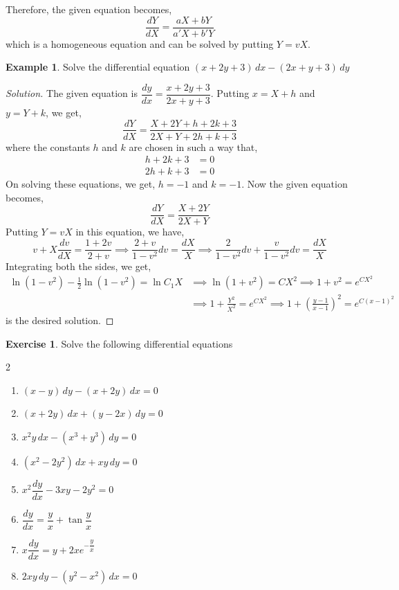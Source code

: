 \documentclass{book}
\theoremstyle{definition}
\newtheorem{exercise}{Exercise}[section]
\newtheorem{example}{Example}[section]
\newenvironment{solution}
    {\begin{proof}[Solution]}
    {\end{proof}}
\begin{document}
\begin{enumerate}
Therefore, the given equation becomes,
\[
\frac{dY}{dX}=\frac{aX+bY}{a'X+b'Y}
\]
which is a homogeneous equation and can be solved by putting $Y=vX$.

\begin{example}
Solve the differential equation $(x+2y+3)\,dx-(2x+y+3)\,dy$
\end{example}

\begin{solution}
The given equation is $\dfrac{dy}{dx}=\dfrac{x+2y+3}{2x+y+3}$. Putting $x=X+h$ and $y=Y+k$, we get,
\[
\frac{dY}{dX}=\frac{X+2Y+h+2k+3}{2X+Y+2h+k+3}
\]
where the constants $h$ and $k$ are chosen in such a way that,
\begin{align*}
    h+2k+3&=0\\
    2h+k+3&=0
\end{align*}
On solving these equations, we get, $h=-1$ and $k=-1$. Now the given equation becomes,
\[
\frac{dY}{dX}=\frac{X+2Y}{2X+Y}
\]
Putting $Y=vX$ in this equation, we have,
\[
v+X\frac{dv}{dX}=\frac{1+2v}{2+v} \implies \frac{2+v}{1-v^2}dv=\frac{dX}{X} \implies \frac{2}{1-v^2}dv+\frac{v}{1-v^2}dv=\frac{dX}{X}
\]
Integrating both the sides, we get,
\begin{align*}
    \ln(1-v^2)-\frac{1}{2}\ln(1-v^2)=\ln C_1X &\implies \ln (1+v^2)=CX^2 \implies 1+v^2=e^{CX^2} \\
    &\implies 1+\frac{Y^2}{X^2}=e^{CX^2} \implies 1+\left(\frac{y-1}{x-1}\right)^2=e^{C(x-1)^2}
\end{align*}
is the desired solution. 
\end{solution}

\end{enumerate}

\begin{exercise}
Solve the following differential equations
\begin{multicols}{2}
\begin{enumerate}[label=(\roman*)]
    \item $(x-y)\,dy-(x+2y)\,dx=0$
    \item $(x+2y)\,dx+(y-2x)\,dy=0$
    \item $x^2y\,dx-(x^3+y^3)\,dy=0$
    \item $(x^2-2y^2)\,dx+xy\,dy=0$
    \item $x^2\dfrac{dy}{dx}-3xy-2y^2=0$
    \item $\dfrac{dy}{dx}=\dfrac{y}{x}+\tan \dfrac{y}{x}$
    \item $x\dfrac{dy}{dx}=y+2xe^{-\dfrac{y}{x}}$
    \item $2xy\,dy-(y^2-x^2)\,dx=0$

\end{enumerate}
\end{multicols}
\end{exercise}
\end{document}
